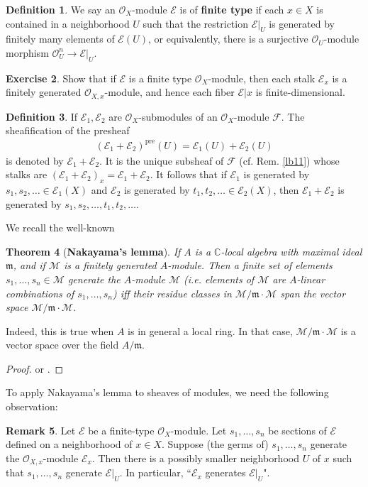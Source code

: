 \documentclass[12pt,b5paper,notitlepage]{report}
\theoremstyle{definition}
\newtheorem{df}{Definition}[section]
\newtheorem{exe}[df]{Exercise}
\newtheorem{rem}[df]{Remark}
\theoremstyle{plain}
\newtheorem{thm}[df]{Theorem}
\newcommand{\fk}{\mathfrak}
\newcommand{\mc}{\mathcal}
\newcommand{\scr}{\mathscr}
\newcommand{\Cbb}{\mathbb C}
\newcommand{\pre}{\mathrm{pre}}
\numberwithin{equation}{section}
\begin{document}
\begin{df}
We say an $\scr O_X$-module $\scr E$ is of \textbf{finite type} if each $x\in X$ is contained in a neighborhood $U$ such that the restriction $\scr E|_U$ is generated by finitely many elements of $\scr E(U)$, or equivalently, there is a surjective $\scr O_U$-module morphism $\scr O_U^n\rightarrow\scr E|_U$.
\end{df}




\begin{exe}
Show that if $\scr E$ is a finite type $\scr O_X$-module, then each stalk $\scr E_x$ is a finitely generated $\scr O_{X,x}$-module, and hence each fiber $\scr E|x$ is finite-dimensional.
\end{exe}
\begin{df}
If $\scr E_1,\scr E_2$ are $\scr O_X$-submodules of an $\scr O_X$-module $\scr F$. The sheafification of the presheaf
\begin{align}
(\scr E_1+\scr E_2)^\pre(U)=\scr E_1(U)+\scr E_2(U)
\end{align}
is denoted by $\scr E_1+\scr E_2$. \index{EE@$\scr E_1+\scr E_2$} It is the unique subsheaf of $\scr F$ (cf. Rem. \ref{lb11}) whose stalks are $(\scr E_1+\scr E_2)_x=\scr E_1+\scr E_2$. It follows that if $\scr E_1$ is generated by $s_1,s_2,\dots\in\scr E_1(X)$ and $\scr E_2$ is generated by $t_1,t_2,\dots\in\scr E_2(X)$, then $\scr E_1+\scr E_2$ is generated by $s_1,s_2,\dots,t_1,t_2,\dots$.
\end{df}


We recall the well-known

\begin{thm}[\textbf{Nakayama's lemma}]
If $A$ is a $\Cbb$-local algebra with maximal ideal $\fk m$, and if $\mc M$ is a finitely generated $A$-module. Then a finite set of elements $s_1,\dots,s_n\in\mc M$ generate the $A$-module $\mc M$ (i.e. elements of $\mc M$ are $A$-linear combinations of $s_1,\dots,s_n$) iff their residue classes in $\mc M/\fk m\cdot\mc M$ span the vector space $\mc M/\fk m\cdot\mc M$.
\end{thm}
Indeed, this is true when $A$ is in general a local ring. In that case, $\mc M/\fk m\cdot\mc M$ is a vector space over the field $A/\fk m$.
\begin{proof}
\cite[Prop. 2.8]{AM} or \cite[Sec. A]{Gui22}.
\end{proof}


To apply Nakayama's lemma to sheaves of modules, we need the following observation:
\begin{rem}\label{lb17}
Let $\scr E$ be a finite-type $\scr O_X$-module. Let $s_1,\dots,s_n$ be sections of $\scr E$ defined on a neighborhood of $x\in X$. Suppose (the germs of) $s_1,\dots,s_n$ generate the $\scr O_{X,x}$-module $\scr E_x$. Then there is a possibly smaller neighborhood $U$ of $x$ such that $s_1,\dots,s_n$ generate $\scr E|_U$. In particular, ``$\scr E_x$ generates $\scr E|_U$".
\end{rem}
\end{document}
